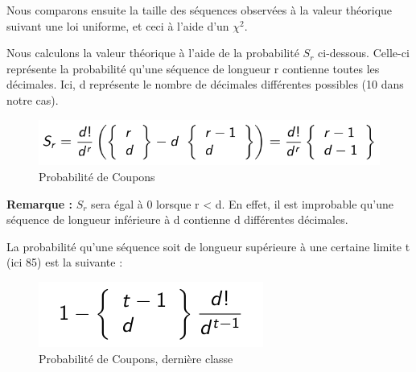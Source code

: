 \documentclass[10pt,a4paper]{article}
\begin{document}
Nous comparons ensuite la taille des séquences observées à la valeur théorique suivant une loi uniforme, et ceci à l'aide d'un $\chi^2$.

Nous calculons la valeur théorique à l'aide de la probabilité $ S_r$ ci-dessous. Celle-ci représente la probabilité qu'une séquence de longueur r contienne toutes les décimales. Ici, d représente le nombre de décimales différentes possibles (10 dans notre cas).

\begin{figure}[h]
		\centering
\includegraphics[scale=0.4]{images/formule.png}  
\caption{Probabilité de Coupons}
	\end{figure}

\textbf{Remarque :} $S_r$ sera égal à 0 lorsque r < d. En effet, il est improbable qu'une séquence de longueur inférieure à d contienne d différentes décimales.

La probabilité qu'une séquence soit de longueur supérieure à une certaine limite t (ici 85) est la suivante :

\begin{figure}[h]
		\centering
\includegraphics[scale=0.4]{images/formule2.png}  
\caption{Probabilité de Coupons, dernière classe}
	\end{figure}

\newpage
\end{document}
